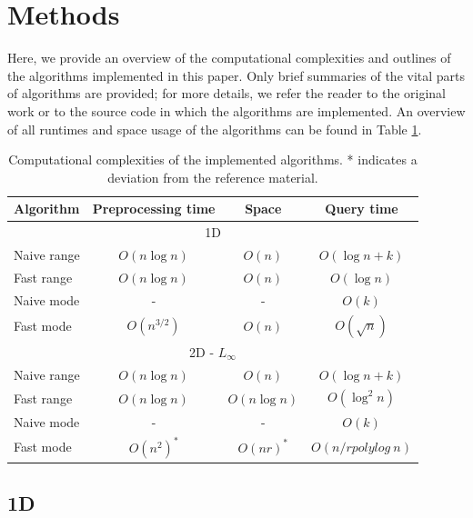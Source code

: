 \documentclass{article}
\begin{document}
\section{Methods}
Here, we provide an overview of the computational complexities and outlines of
the algorithms implemented in this paper. Only brief summaries of the vital
parts of algorithms are provided; for more details, we refer the reader to the
original work or to the source code in which the algorithms are implemented. An
overview of all runtimes and space usage of the algorithms can be found in
Table \ref{tab:runtimes}.
\begin{table}[h]
    \centering
    \begin{tabular}{|l|ccc|}
        \hline
        Algorithm   & Preprocessing time & Space         & Query time                   \\
        \hline
        \hline
        \multicolumn{4}{|c|}{1D}                                                        \\
        \hline
        Naive range & $O(n \log n)$      & $O(n)$        & $O(\log n + k)$              \\
        Fast range  & $O(n \log n)$      & $O(n)$        & $O(\log n)$                  \\
        Naive mode  & -                  & -             & $O(k)$                       \\
        Fast mode   & $O(n^{3/2})$       & $O(n)$        & $O(\sqrt{n})$                \\
        \hline
        \multicolumn{4}{|c|}{2D - $L_\infty$}                                           \\
        \hline
        Naive range & $O(n \log n)$      & $O(n)$        & $O(\log n + k)$              \\
        Fast range  & $O(n \log n)$      & $O(n \log n)$ & $O(\log^2 n)$                \\
        Naive mode  & -                  & -             & $O(k)$                       \\
        Fast mode   & $O(n^2)^*$         & $O(nr)^*$     & $O(n/r \textit{polylog}\:n)$ \\
        \hline
    \end{tabular}
    \caption{Computational complexities of the implemented algorithms. * indicates a deviation from the reference material.}
    \label{tab:runtimes}
\end{table}
\subsection{1D}
\end{document}
